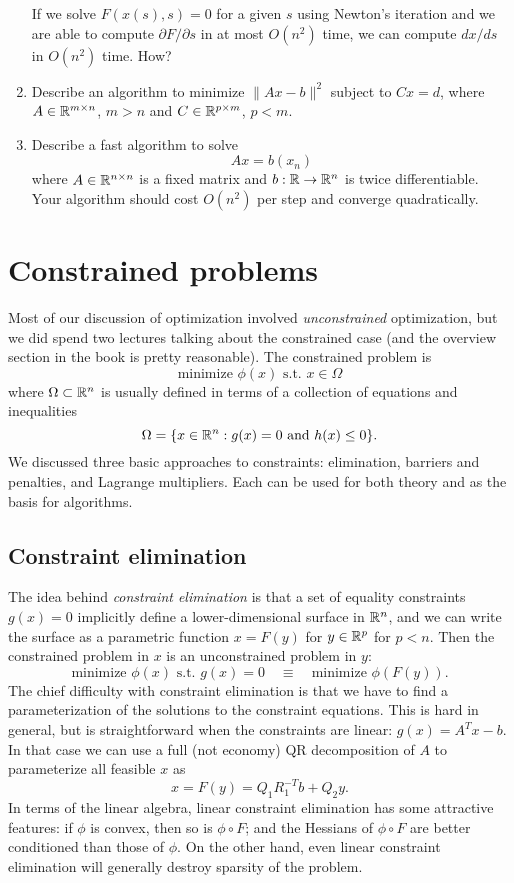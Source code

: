 \documentclass[12pt, leqno]{article}
\begin{document}
\begin{enumerate}
  If we solve $F(x(s), s) = 0$ for a given $s$ using Newton's
  iteration and we are able to compute $\partial F/\partial s$
  in at most $O(n^2)$ time, we can compute $dx/ds$ in $O(n^2)$ time.
  How?
\item
  Describe an algorithm to minimize $\|Ax-b\|^2$ subject to $Cx = d$,
  where $A \in \mathbb{R}^{m \times n}$, $m > n$ and $C \in \mathbb{R}^{p \times m}$,
  $p < m$.
\item
  Describe a fast algorithm to solve
  \[
    Ax = b(x_n)
  \]
  where $A \in \mathbb{R}^{n \times n}$ is a fixed matrix and
  $b : \mathbb{R} \rightarrow \mathbb{R}^n$ is twice differentiable.
  Your algorithm should cost $O(n^2)$ per step and converge quadratically.
\end{enumerate}

\newpage
\section{Constrained problems}

Most of our discussion of optimization involved {\em unconstrained}
optimization, but we did spend two lectures talking about the
constrained case (and the overview section in the book is pretty
reasonable).  The constrained problem is
\[
  \mbox{minimize } \phi(x) \mbox{ s.t.~} x \in \Omega
\]
where $\Omega \subset \mathbb{R}^n$ is usually defined in terms of a
collection of equations and inequalities
\[
  \Omega = \{ x \in \mathbb{R}^n : g(x) = 0 \mbox{ and } h(x) \leq 0 \}.
\]
We discussed three basic approaches to constraints: elimination,
barriers and penalties, and Lagrange multipliers.  Each can be
used for both theory and as the basis for algorithms.

\subsection{Constraint elimination}

The idea behind {\em constraint elimination} is that a set of equality
constraints $g(x) = 0$ implicitly define a lower-dimensional surface
in $\mathbb{R}^n$, and we can write the surface as a parametric function
$x = F(y)$ for $y \in \mathbb{R}^p$ for $p < n$.
Then the constrained problem in $x$ is an unconstrained problem in $y$:
\[
  \mbox{minimize } \phi(x) \mbox{ s.t.~} g(x) = 0 \quad \equiv \quad
  \mbox{minimize } \phi(F(y)).
\]
The chief difficulty with constraint elimination is that we have to
find a parameterization of the solutions to the constraint equations.
This is hard in general, but is straightforward when the constraints
are linear: $g(x) = A^T x - b$.  In that case we can use a full (not
economy) QR decomposition of $A$ to parameterize all feasible $x$ as
\[
  x = F(y) = Q_1 R_1^{-T} b + Q_2 y.
\]
In terms of the linear algebra, linear constraint elimination has
some attractive features: if $\phi$ is convex, then so is
$\phi \circ F$; and the Hessians of $\phi \circ F$ are better
conditioned than those of $\phi$.  On the other hand, even linear
constraint elimination will generally destroy sparsity of the problem.
  
\end{document}
